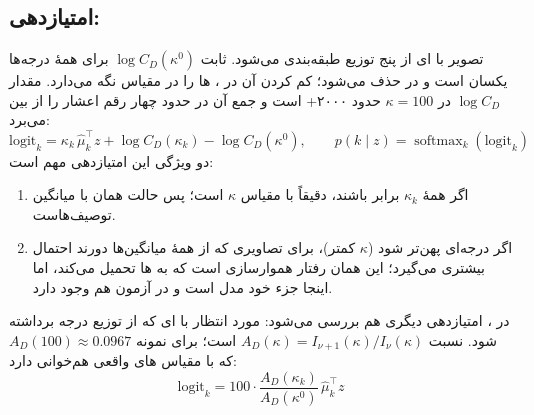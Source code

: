 \subsection{امتیازدهی:  }
تصویر با ‌ای از پنج توزیع طبقه‌بندی می‌شود. ثابت $\log C_D(\kappa^{0})$ برای همهٔ درجه‌ها یکسان است و در  حذف می‌شود؛ کم کردن آن در ، ها را در مقیاس  نگه می‌دارد. مقدار $\log C_D$ در $\kappa=100$ حدود ۲۰۰۰+ است و جمع آن در  حدود چهار رقم اعشار را از بین می‌برد:
\begin{equation}
\mathrm{logit}_k = \kappa_k\, \hat{\mu}_k^{\top} z + \log C_D(\kappa_k) - \log C_D(\kappa^{0}), \qquad p(k \mid z) = \operatorname{softmax}_k(\mathrm{logit}_k)
\label{eq:vmf-logit}
\end{equation}
دو ویژگی این امتیازدهی مهم است:
\begin{enumerate}[label=\arabic*.]
\item اگر همهٔ $\kappa_k$ برابر باشند،  دقیقاً    با مقیاس $\kappa$ است؛ پس حالت  همان   با میانگین توصیف‌هاست.
\item اگر درجه‌ای پهن‌تر شود ($\kappa$ کمتر)، برای تصاویری که از همهٔ میانگین‌ها دورند احتمال بیشتری می‌گیرد؛ این همان رفتار هموارسازی است که  به ها تحمیل می‌کند، اما اینجا جزء خود مدل است و در آزمون هم وجود دارد.
\end{enumerate}
در ، امتیازدهی دیگری هم بررسی می‌شود:  مورد انتظار با ‌ای که از توزیع درجه برداشته شود. نسبت $A_D(\kappa) = I_{\nu+1}(\kappa) / I_{\nu}(\kappa)$  است؛ برای نمونه $A_D(100) \approx 0.0967$ که با مقیاس های واقعی  هم‌خوانی دارد:
\begin{equation}
\mathrm{logit}_k = 100 \cdot \frac{A_D(\kappa_k)}{A_D(\kappa^{0})}\, \hat{\mu}_k^{\top} z
\label{eq:expected}
\end{equation}

